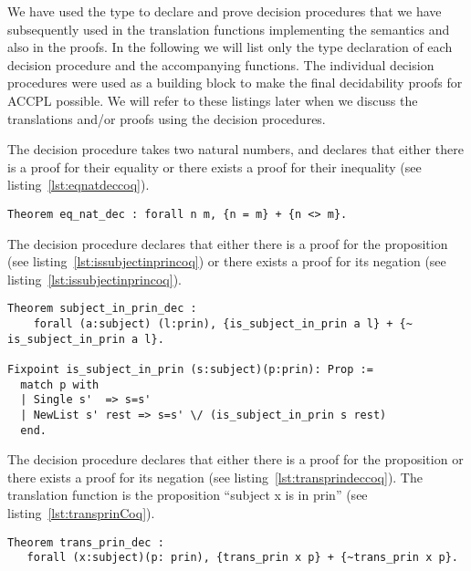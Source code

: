 We have used the  type to declare and prove decision procedures that we have subsequently used in the translation functions implementing the semantics and also in the proofs. In the following we will list only the type declaration of each decision procedure and the accompanying functions. The individual decision procedures were used as a building block to make the final decidability proofs for \ac{ACCPL} possible. We will refer to these listings later when we discuss the translations and/or proofs using the decision procedures.

The decision procedure  takes two natural numbers, and declares that either there is a proof for their equality or there exists a proof for their inequality (see listing~\ref{lst:eqnatdeccoq}).

\begin{lstlisting}
Theorem eq_nat_dec : forall n m, {n = m} + {n <> m}.
\end{lstlisting}

The decision procedure  declares that either there is a proof for the proposition  (see listing~\ref{lst:issubjectinprincoq}) or there exists a proof for its negation (see listing~\ref{lst:issubjectinprincoq}). 

\begin{lstlisting}
Theorem subject_in_prin_dec :
    forall (a:subject) (l:prin), {is_subject_in_prin a l} + {~ is_subject_in_prin a l}.

Fixpoint is_subject_in_prin (s:subject)(p:prin): Prop :=
  match p with
  | Single s'  => s=s'
  | NewList s' rest => s=s' \/ (is_subject_in_prin s rest)
  end.
\end{lstlisting}

The decision procedure  declares that either there is a proof for the proposition  or there exists a proof for its negation (see listing~\ref{lst:transprindeccoq}). The translation function  is the proposition ``subject x is in prin'' (see listing~\ref{lst:transprinCoq}).

\begin{minipage}[c]{0.95\textwidth}
\begin{lstlisting}
Theorem trans_prin_dec :
   forall (x:subject)(p: prin), {trans_prin x p} + {~trans_prin x p}.
\end{lstlisting}
\end{minipage}

